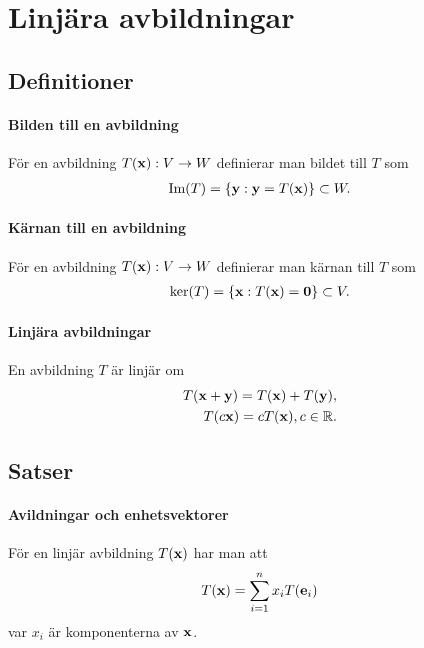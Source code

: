 \section{Linjära avbildningar}

\subsection{Definitioner}

\paragraph{Bilden till en avbildning}
För en avbildning $T(\vect{x}): V\to W$ definierar man bildet till $T$ som
\begin{align*}
	\Im{T} = \{\vect{y} : \vect{y} = T(\vect{x})\}\subset W.
\end{align*}

\paragraph{Kärnan till en avbildning}
För en avbildning $T(\vect{x}): V\to W$ definierar man kärnan till $T$ som
\begin{align*}
	\ker{T} = \{\vect{x} : T(\vect{x})= \vect{0}\}\subset V.
\end{align*}

\paragraph{Linjära avbildningar}
En avbildning $T$ är linjär om
\begin{align*}
	T(\vect{x} + \vect{y}) = T(\vect{x}) + T(\vect{y}), \\
	T(c\vect{x}) = cT(\vect{x}), c\in\R.
\end{align*}

\subsection{Satser}

\paragraph{Avildningar och enhetsvektorer}
För en linjär avbildning $T(\vect{x})$ har man att
\begin{align*}
	T(\vect{x}) = \sum\limits_{i = 1}^{n} x_iT(\vect{e}_i)
\end{align*}
var $x_i$ är komponenterna av $\vect{x}$.

